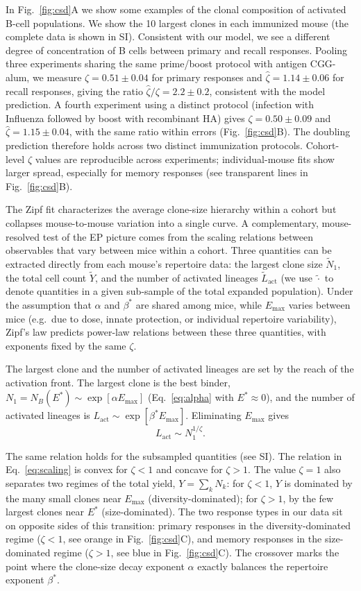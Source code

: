 \documentclass[aps, pre, twocolumn, 10pt, groupedaddress, superscriptaddress, linenumbers]{revtex4-2}
\newcommand{\EQ}{\begin{equation}}
\newcommand{\EE}{\end{equation}}
\newcommand{\act}{\text{act}}
\newcommand{\DG}{E}
\begin{document}
In Fig.~\ref{fig:csd}A we show some examples of the clonal composition of activated B-cell populations.
We show the 10 largest clones in each immunized mouse (the complete data is shown in SI).
Consistent with our model, we see a different degree of concentration of B cells between primary and recall responses.
Pooling three experiments sharing the same prime/boost protocol with antigen CGG-alum, we measure $\zeta = 0.51 \pm 0.04$ for primary responses and $\hat\zeta = 1.14 \pm 0.06$ for recall responses, giving the ratio $\hat\zeta/\zeta = 2.2 \pm 0.2$, consistent with the model prediction.
A fourth experiment using a distinct protocol (infection with Influenza followed by boost with recombinant HA) gives $\zeta = 0.50 \pm 0.09$ and $\hat\zeta = 1.15 \pm 0.04$, with the same ratio within errors (Fig.~\ref{fig:csd}B).
The doubling prediction therefore holds across two distinct immunization protocols.
Cohort-level $\zeta$ values are reproducible across experiments; individual-mouse fits show larger spread, especially for memory responses (see transparent lines in Fig.~\ref{fig:csd}B).

The Zipf fit characterizes the average clone-size hierarchy within a cohort but collapses mouse-to-mouse variation into a single curve.
A complementary, mouse-resolved test of the EP picture comes from the scaling relations between observables that vary between mice within a cohort.
Three quantities can be extracted directly from each mouse's repertoire data: the largest clone size $\tilde N_1$, the total cell count $\tilde Y$, and the number of activated lineages $\tilde L_\act$ (we use $\tilde \cdot$ to denote quantities in a given sub-sample of the total expanded population).
Under the assumption that $\alpha$ and $\beta^*$ are shared among mice, while $\DG_{\max}$ varies between mice (e.g.\ due to dose, innate protection, or individual repertoire variability), Zipf's law predicts power-law relations between these three quantities, with exponents fixed by the same $\zeta$.

The largest clone and the number of activated lineages are set by the reach of the activation front.
The largest clone is the best binder, $N_1 = N_B(\DG^*) \sim \exp[\alpha\DG_{\max}]$ (Eq.~\ref{eq:alpha} with $\DG^* \approx 0$), and the number of activated lineages is $L_\act \sim \exp[\beta^*\DG_{\max}]$.
Eliminating $\DG_{\max}$ gives
\EQ
L_\act \sim N_1^{1/\zeta}.
\label{eq:scaling}
\EE

The same relation holds for the subsampled quantities (see SI).
The relation in Eq.~\ref{eq:scaling} is convex for $\zeta < 1$ and concave for $\zeta > 1$.
The value $\zeta = 1$ also separates two regimes of the total yield, $Y = \sum_k N_k$: for $\zeta < 1$, $Y$ is dominated by the many small clones near $\DG_{\max}$ (diversity-dominated); for $\zeta > 1$, by the few largest clones near $\DG^*$ (size-dominated).
The two response types in our data sit on opposite sides of this transition: primary responses in the diversity-dominated regime ($\zeta < 1$, see orange in Fig.~\ref{fig:csd}C), and memory responses in the size-dominated regime ($\zeta > 1$, see blue in Fig.~\ref{fig:csd}C).
The crossover marks the point where the clone-size decay exponent $\alpha$ exactly balances the repertoire exponent $\beta^*$.
\end{document}
